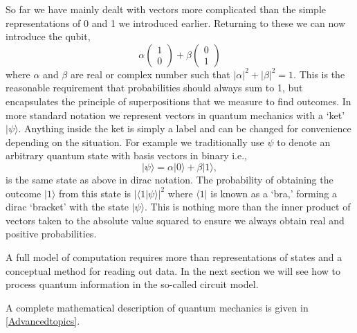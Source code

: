 So far we have mainly dealt with vectors more complicated than the simple representations of 0 and 1 we introduced earlier. Returning to these we can now introduce the qubit,
\begin{equation}
    \alpha \begin{pmatrix}  1\\ 0 \end{pmatrix} + \beta \begin{pmatrix} 0\\ 1 \end{pmatrix}
\end{equation}
where $\alpha$ and $\beta$ are real or complex number such that $|\alpha|^2 + |\beta|^2 = 1$. This is the reasonable requirement that probabilities should always sum to 1, but encapsulates the principle of superpositions that we measure to find outcomes. In more standard notation we represent vectors in quantum mechanics with a `ket' $|\psi\rangle$. Anything inside the ket is simply a label and can be changed for convenience depending on the situation. For example we traditionally use $\psi$ to denote an arbitrary quantum state with basis vectors in binary i.e.,
\begin{equation}
    |\psi\rangle = \alpha |0\rangle + \beta |1\rangle ,
\end{equation}
is the same state as above in dirac notation. The probability of obtaining the outcome $|1\rangle$ from this state is $|\langle 1|\psi\rangle|^2$ where $\langle 1|$ is known as a `bra,' forming a dirac `bracket' with the state $|\psi\rangle.$ This is nothing more than the inner product of vectors taken to the absolute value squared to ensure we always obtain real and positive probabilities. 

A full model of computation requires more than representations of states and a conceptual method for reading out data. In the next section we will see how to process quantum information in the so-called circuit model. 


A complete mathematical description of quantum mechanics is given in \autoref{Advancedtopics}. 
